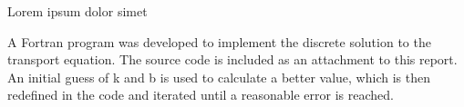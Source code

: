 \documentclass[../main.tex]{subfiles}
\begin{document}
Lorem ipsum dolor simet

A Fortran program was developed to implement the discrete solution to the transport equation. The source code is included as an attachment to this report. An initial guess of k and b is used to calculate a better value, which is then redefined in the code and iterated until a reasonable error is reached.


	
\end{document}
